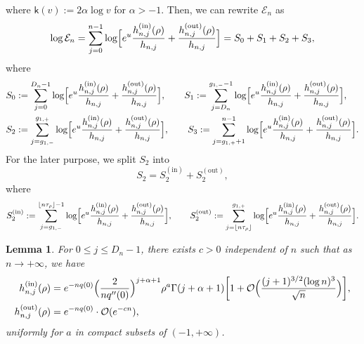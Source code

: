 \documentclass[reqno]{amsart}
\newcommand{\1}{\mathds{1}}
\numberwithin{equation}{section}
\newtheorem{lemma}[theorem]{Lemma}
\theoremstyle{definition}
\begin{document}
where $\mathsf{k}(v):=2\alpha\log v$ for $\alpha>-1$.
Then, we can rewrite $\mathcal{E}_{n}$ as 
\begin{equation}
\label{def of log calEn splitted}
 \log\mathcal{E}_n=\sum_{j=0}^{n-1}\log\Bigl[
e^{u}\frac{h_{n,j}^{(\mathrm{in})}(\rho)}{h_{n,j}}+\frac{h_{n,j}^{(\mathrm{out})}(\rho)}{h_{n,j}}
 \Bigr]=S_0+S_1+S_2+S_3,
\end{equation}
where 
\begin{align*}
S_0&:=\sum_{j=0}^{D_n-1}\log\Bigl[
e^{u}\frac{h_{n,j}^{(\mathrm{in})}(\rho)}{h_{n,j}}+\frac{h_{n,j}^{(\mathrm{out})}(\rho)}{h_{n,j}}
 \Bigr],
\qquad
S_1:=\sum_{j=D_n}^{g_{1,-}-1}\log\Bigl[
e^{u}\frac{h_{n,j}^{(\mathrm{in})}(\rho)}{h_{n,j}}+\frac{h_{n,j}^{(\mathrm{out})}(\rho)}{h_{n,j}}
 \Bigr],
\\
S_2&:=\sum_{j=g_{1,-}}^{g_{1,+}}\log\Bigl[
e^{u}\frac{h_{n,j}^{(\mathrm{in})}(\rho)}{h_{n,j}}+\frac{h_{n,j}^{(\mathrm{out})}(\rho)}{h_{n,j}}
 \Bigr],
\qquad
S_3:=\sum_{j=g_{1,+}+1}^{n-1}\log\Bigl[
e^{u}\frac{h_{n,j}^{(\mathrm{in})}(\rho)}{h_{n,j}}+\frac{h_{n,j}^{(\mathrm{out})}(\rho)}{h_{n,j}}
 \Bigr].
\end{align*}
For the later purpose, we split $S_2$ into 
\begin{equation*}
    S_2=S_2^{(\mathrm{in})}+S_2^{(\mathrm{out})}, 
\end{equation*}
where 
\[
S_2^{(\mathrm{in})}:=\sum_{j=g_{1,-}}^{\lfloor n\tau_{\rho}\rfloor-1}\log\Bigl[
 e^{u}\frac{h_{n,j}^{(\mathrm{in})}(\rho)}{h_{n,j}}+\frac{h_{n,j}^{(\mathrm{out})}(\rho)}{h_{n,j}}
 \Bigr],
\qquad
S_2^{(\mathrm{out})}:=\sum_{j=\lfloor n\tau_{\rho}\rfloor}^{g_{1,+}}\log\Bigl[
e^{u}\frac{h_{n,j}^{(\mathrm{in})}(\rho)}{h_{n,j}}+\frac{h_{n,j}^{(\mathrm{out})}(\rho)}{h_{n,j}}
 \Bigr]. 
\]

\begin{lemma}
\label{lemma:0 j Dn minus1}
For $0\leq j\leq D_{n}-1$, there exists $c>0$ independent of $n$ such that as $n\to+\infty$, we have 
\begin{align}
\label{def of 0 j Dn in}
h_{n,j}^{(\mathrm{in})}(\rho)&=
e^{-nq(0)}\Bigl(\frac{2}{nq''(0)}\Bigr)^{j+\alpha+1}
\rho^{a}\Gamma(j+\alpha+1)
\bigg[1+\mathcal{O}\Bigl(\frac{(j+1)^{3/2}(\log n)^3}{\sqrt{n}}\Bigr)\bigg], 
\\
\label{def of 0 j Dn out}
h_{n,j}^{(\mathrm{out})}(\rho)&=e^{-nq(0)}\cdot \mathcal{O}(e^{-cn}),     
\end{align}
uniformly for $a$ in compact subsets of $(-1,+\infty)$. 
\end{lemma}
\end{document}
